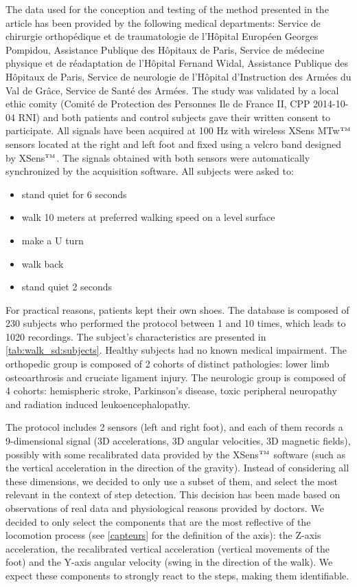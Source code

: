 \documentclass[../thesis.tex]{subfiles}
\begin{document}
The data used for the conception and testing of the method presented in the article has been provided by the following medical departments: Service de chirurgie orthop{\'e}dique et de traumatologie de l'H{\^o}pital Europ{\'e}en Georges Pompidou, Assistance Publique des H{\^o}pitaux de Paris, Service de m{\'e}decine physique et de r{\'e}adaptation de l'H{\^o}pital Fernand Widal, Assistance Publique des H{\^o}pitaux de Paris, Service de neurologie de l'H{\^o}pital d’Instruction des Arm{\'e}es du Val de Gr{\^a}ce, Service de Sant{\'e} des Arm{\'e}es. The study was validated by a local ethic comity (Comit{\'e} de Protection des Personnes Ile de France II, CPP 2014-10-04 RNI) and both patients and control subjects gave their written consent to participate. All signals have been acquired at 100 Hz with wireless XSens MTw$^{\mbox{\tiny TM}}$ sensors located at the right and left foot and fixed using a velcro band designed by XSens$^{\mbox{\tiny TM}}$. The signals obtained with both sensors were automatically 
synchronized by the acquisition software.
All subjects were asked to:
\begin{itemize}
	\item stand quiet for 6 seconds
	\item walk 10 meters at preferred walking speed on a level surface
	\item make a U turn
	\item walk back
	\item stand quiet 2 seconds
\end{itemize}
For practical reasons, patients kept their own shoes. The database is composed of 230 subjects who performed the protocol between 1 and 10 times, which leads to 1020 recordings.  The subject's characteristics are presented in \autoref{tab:walk_sd:subjects}. Healthy subjects had no known medical impairment. The orthopedic group is composed of 2 cohorts of distinct pathologies: lower limb osteoarthrosis and cruciate ligament injury. The neurologic group is composed of 4 cohorts: hemispheric stroke, Parkinson’s disease, toxic peripheral neuropathy and radiation induced leukoencephalopathy. 



The protocol includes 2 sensors (left and right foot), and each of them records a 9-dimensional signal (3D accelerations, 3D angular velocities, 3D magnetic fields), possibly with some recalibrated data provided by the XSens$^{\mbox{\tiny TM}}$ software (such as the vertical acceleration in the direction of the gravity). Instead of considering all these dimensions, we decided to only use a subset of them, and select the most relevant in the context of step detection. This decision has been made based on observations of real data and physiological reasons provided by doctors. We decided to only select the components that are the most reflective of the locomotion process (see \autoref{capteurs} for the definition of the axis): the Z-axis acceleration, the recalibrated vertical acceleration (vertical movements of the foot) and the Y-axis angular velocity (swing in the direction of the walk). We expect these components to strongly react to the steps, making them identifiable. 
\end{document}
